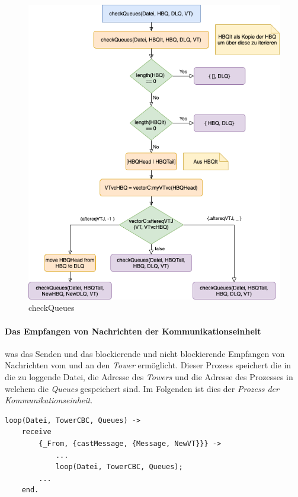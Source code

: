 \begin{figure}[htbp]
\begin{center}
\includegraphics[scale=0.6]{Latex/Bilder/checkQueues.png}
\caption{\label{fig:flow_checkQueues} checkQueues}
\end{center}
\end{figure}
    
\paragraph{Das Empfangen von Nachrichten der Kommunikationseinheit} was das Senden und das blockierende und nicht blockierende Empfangen von Nachrichten vom und an den \textit{Tower} ermöglicht. Dieser Prozess speichert die in die zu loggende Datei, die Adresse des \textit{Towers} und die Adresse des Prozesses in welchem die \textit{Queues} gespeichert sind. Im Folgenden ist dies der \textit{Prozess der Kommunikationseinheit}.

\begin{lstlisting}
loop(Datei, TowerCBC, Queues) ->
    receive
        {_From, {castMessage, {Message, NewVT}}} ->
            ...
            loop(Datei, TowerCBC, Queues);
        ...
    end.
\end{lstlisting}

